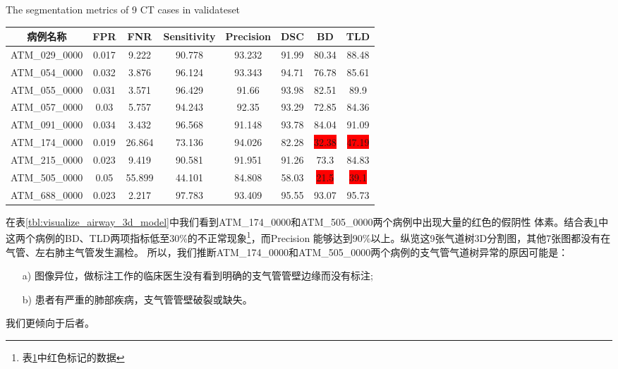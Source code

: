 \begin{table}[!htp]
        {The segmentation metrics of 9 CT cases in validateset}
    \centering
    \label{tbl:validateset_airway_tree_metrics}
\begin{tabular}{cccccccc}
        \toprule
        病例名称          & FPR           & FNR            & Sensitivity     & Precision      & DSC           & BD            & TLD           \\
        \midrule
        ATM\_029\_0000 & 0.017           & 9.222          & 90.778          & 93.232         & 91.99         & 80.34         & 88.48         \\
        ATM\_054\_0000 & 0.032           & 3.876          & 96.124          & 93.343         & 94.71         & 76.78         & 85.61         \\
        ATM\_055\_0000 & 0.031           & 3.571          & 96.429          & 91.66          & 93.98         & 82.51         & 89.9          \\
        ATM\_057\_0000 & 0.03            & 5.757          & 94.243          & 92.35          & 93.29         & 72.85         & 84.36         \\
        ATM\_091\_0000 & 0.034           & 3.432          & 96.568          & 91.148         & 93.78         & 84.04         & 91.09         \\
        ATM\_174\_0000 & 0.019           & 26.864         & 73.136          & 94.026         & 82.28         & \colorbox{red}{32.38}         & \colorbox{red}{47.19}         \\
        ATM\_215\_0000 & 0.023           & 9.419          & 90.581          & 91.951         & 91.26         & 73.3          & 84.83         \\
        ATM\_505\_0000 & 0.05            & 55.899         & 44.101          & 84.808         & 58.03         & \colorbox{red}{21.5}          & \colorbox{red}{39.1}          \\
        ATM\_688\_0000 & 0.023           & 2.217          & 97.783          & 93.409         & 95.55         & 93.07         & 95.73         \\
        \bottomrule
    \end{tabular}
\end{table}
在表\ref{tbl:visualize_airway_3d_model}中我们看到ATM\_174\_0000和ATM\_505\_0000两个病例中出现大量的红色的假阴性
体素。结合表\ref{tbl:validateset_airway_tree_metrics}中这两个病例的BD、TLD两项指标低至30\%的不正常现象\footnote{
表\ref{tbl:validateset_airway_tree_metrics}中红色标记的数据}，而Precision
能够达到90\%以上。纵览这9张气道树3D分割图，其他7张图都没有在气管、左右肺主气管发生漏检。 
所以，我们推断ATM\_174\_0000和ATM\_505\_0000两个病例的支气管气道树异常的原因可能是：
\begin{enumerate}
    \item[a)] 图像异位，做标注工作的临床医生没有看到明确的支气管管壁边缘而没有标注;
    \item[b)] 患者有严重的肺部疾病，支气管管壁破裂或缺失。
\end{enumerate}
我们更倾向于后者。

